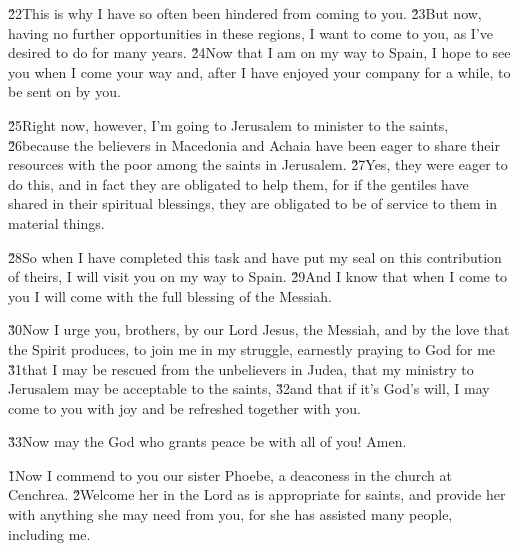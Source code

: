 \v{22}This is why I have so often been hindered from coming to you. \v{23}But now, having no further opportunities in these regions, I want to come to you, as I've desired to do for many years. \v{24}Now that I am on my way to Spain, I hope to see you when I come your way and, after I have enjoyed your company for a while, to be sent on by you.

\v{25}Right now, however, I'm going to Jerusalem to minister to the saints, \v{26}because the believers in Macedonia and Achaia have been eager to share their resources with the poor among the saints in Jerusalem. \v{27}Yes, they were eager to do this, and in fact they are obligated to help them, for if the gentiles have shared in their spiritual blessings, they are obligated to be of service to them in material things.

\v{28}So when I have completed this task and have put my seal on this contribution of theirs, I will visit you on my way to Spain. \v{29}And I know that when I come to you I will come with the full blessing of the Messiah.

\v{30}Now I urge you, brothers, by our Lord Jesus, the Messiah, and by the love that the Spirit produces, to join me in my struggle, earnestly praying to God for me \v{31}that I may be rescued from the unbelievers in Judea, that my ministry to Jerusalem may be acceptable to the saints, \v{32}and that if it's God's will, I may come to you with joy and be refreshed together with you.

\v{33}Now may the God who grants peace be with all of you! Amen.

\v{1}Now I commend to you our sister Phoebe, a deaconess in the church at Cenchrea. \v{2}Welcome her in the Lord as is appropriate for saints, and provide her with anything she may need from you, for she has assisted many people, including me.

